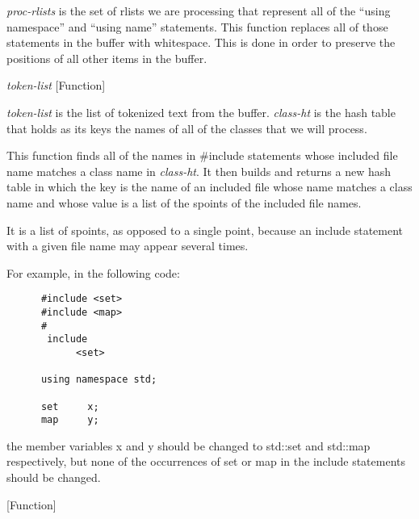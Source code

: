 \begin{doc-string}
\emph{proc-rlists} is the set of rlists we are processing that represent all of the
``using namespace'' and ``using name'' statements.  This function replaces all
of those statements in the buffer with whitespace.  This is done in order to
preserve the positions of all other items in the buffer.
\end{doc-string}

\vspace{1em}
\noindent
{}
\usebox{\funcname}\emph{token-list}
 \hfill [Function]
\hspace*{\wd\funcname}

\begin{doc-string}
\emph{token-list} is the list of tokenized text from the buffer.  \emph{class-ht} is the
hash table that holds as its keys the names of all of the classes that we will
process.

This function finds all of the names in \#include statements whose included file
name matches a class name in \emph{class-ht}.  It then builds and returns a new hash
table in which the key is the name of an included file whose name matches a
class name and whose value is a list of the spoints of the included file names.

It is a list of spoints, as opposed to a single point, because an include
statement with a given file name may appear several times.

For example, in the following code:

\small{\begin{verbatim}
      #include <set>
      #include <map>
      #
       include
            <set>

      using namespace std;

      set     x;
      map     y;
\end{verbatim}}

the member variables x and y should be changed to std::set and std::map
respectively, but none of the occurrences of set or map in the include
statements should be changed.
\end{doc-string}

\vspace{1em}
\noindent
{}
\usebox{\funcname}
 \hfill [Function]

